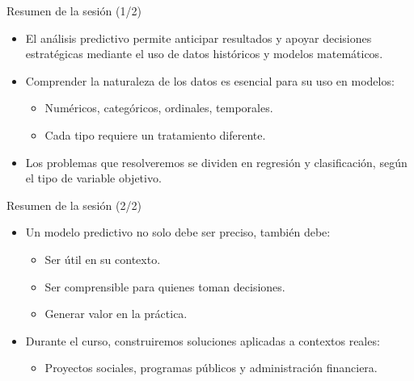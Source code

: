 \documentclass{beamer}
\begin{document}
\begin{frame}{Resumen de la sesión (1/2)}
	\begin{itemize}
		\item El análisis predictivo permite anticipar resultados y apoyar decisiones estratégicas mediante el uso de datos históricos y modelos matemáticos.
		
		\item Comprender la naturaleza de los datos es esencial para su uso en modelos:
		\begin{itemize}
			\item Numéricos, categóricos, ordinales, temporales.
			\item Cada tipo requiere un tratamiento diferente.
		\end{itemize}
		
		\item Los problemas que resolveremos se dividen en regresión y clasificación, según el tipo de variable objetivo.
	\end{itemize}
\end{frame}

\begin{frame}{Resumen de la sesión (2/2)}
	\begin{itemize}
		\item Un modelo predictivo no solo debe ser preciso, también debe:
		\begin{itemize}
			\item Ser útil en su contexto.
			\item Ser comprensible para quienes toman decisiones.
			\item Generar valor en la práctica.
		\end{itemize}
		
		\item Durante el curso, construiremos soluciones aplicadas a contextos reales:
		\begin{itemize}
			\item Proyectos sociales, programas públicos y administración financiera.
		\end{itemize}
	\end{itemize}
\end{frame}
\end{document}
